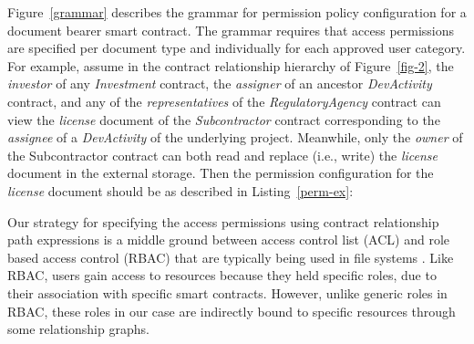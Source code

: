 Figure~\ref{grammar} describes the grammar for permission policy configuration for a document bearer smart contract. The grammar requires that access permissions are specified per document type and individually for each approved user category. For example, assume in the contract relationship hierarchy of Figure~\ref{fig-2}, the {\it investor} of any {\it Investment} contract, the {\it assigner} of an ancestor {\it DevActivity} contract, and any of the {\it representatives} of the {\it RegulatoryAgency} contract can view the {\it license} document of the {\it Subcontractor} contract corresponding to the {\it assignee} of a {\it DevActivity} of the underlying project. Meanwhile, only the {\it owner} of the {Subcontractor} contract can both read and replace (i.e., write) the {\it license} document in the external storage. Then the permission configuration for the {\it license} document should be as described in Listing~\ref{perm-ex}:

\lstset{caption=Example access permission configuration, label=perm-ex}


Our strategy for specifying the access permissions using contract relationship path expressions is a middle ground between access control list (ACL) and role based access control (RBAC) that are typically being used in file systems \cite{Barkley:1997:CSR:266741.266769}. Like RBAC, users gain access to resources because they held specific roles, due to their association with specific smart contracts. However, unlike generic roles in RBAC, these roles in our case are indirectly bound to specific resources through some relationship graphs.       

